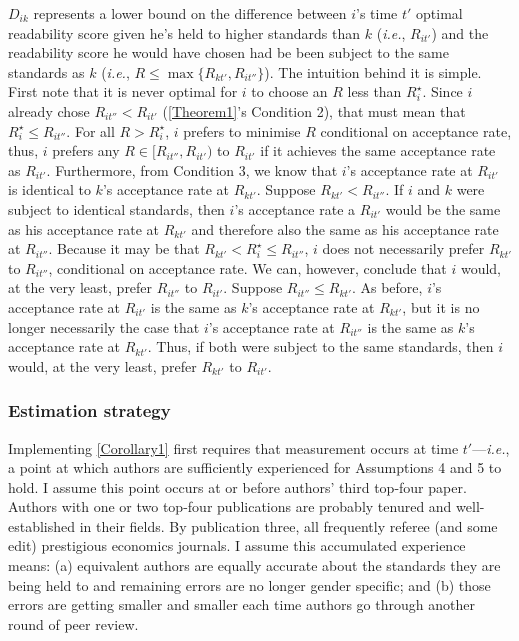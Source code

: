 $D_{ik}$ represents a lower bound on the difference between $i$'s time $t'$ optimal readability score given he's held to higher standards than $k$ (\emph{i.e.}, $R_{it'}$) and the readability score he would have chosen had be been subject to the same standards as $k$ (\emph{i.e.}, $R\le\max\{R_{kt'},R_{it''}\}$). The intuition behind it is simple. First note that it is never optimal for $i$ to choose an $R$ less than $R_i^\star$. Since $i$ already chose $R_{it''}<R_{it'}$ (\autoref{Theorem1}'s Condition 2), that must mean that $R_i^\star\le R_{it''}$. For all $R>R_i^\star$, $i$ prefers to minimise $R$ conditional on acceptance rate, thus, $i$ prefers any $R\in[R_{it''},R_{it'})$ to $R_{it'}$ if it achieves the same acceptance rate as $R_{it'}$. Furthermore, from Condition 3, we know that $i$'s acceptance rate at $R_{it'}$ is identical to $k$'s acceptance rate at $R_{kt'}$. Suppose $R_{kt'}<R_{it''}$. If $i$ and $k$ were subject to identical standards, then $i$'s acceptance rate a $R_{it'}$ would be the same as his acceptance rate at $R_{kt'}$ and therefore also the same as his acceptance rate at $R_{it''}$. Because it may be that $R_{kt'}<R_i^\star\le R_{it''}$, $i$ does not necessarily prefer $R_{kt'}$ to $R_{it''}$, conditional on acceptance rate. We can, however, conclude that $i$ would, at the very least, prefer $R_{it''}$ to $R_{it'}$. Suppose $R_{it''}\le R_{kt'}$. As before, $i$'s acceptance rate at $R_{it'}$ is the same as $k$'s acceptance rate at $R_{kt'}$, but it is no longer necessarily the case that $i$'s acceptance rate at $R_{it''}$ is the same as $k$'s acceptance rate at $R_{kt'}$. Thus, if both were subject to the same standards, then $i$ would, at the very least, prefer $R_{kt'}$ to $R_{it'}$.

\subsubsection{Estimation strategy}
\label{matchingestimation}

Implementing \autoref{Corollary1} first requires that measurement occurs at time $t'$---\emph{i.e.}, a point at which authors are sufficiently experienced for Assumptions 4 and 5 to hold. I assume this point occurs at or before authors' third top-four paper. Authors with one or two top-four publications are probably tenured and well-established in their fields. By publication three, all frequently referee (and some edit) prestigious economics journals. I assume this accumulated experience means: (a) equivalent authors are equally accurate about the standards they are being held to and remaining errors are no longer gender specific; and (b) those errors are getting smaller and smaller each time authors go through another round of peer review.

